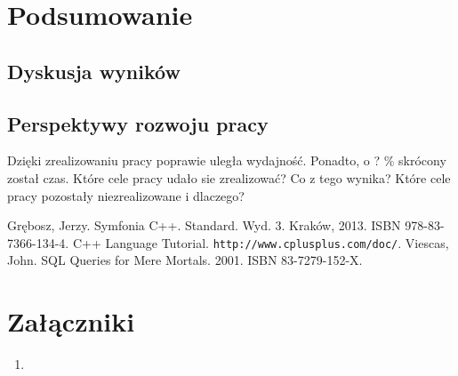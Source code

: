 \documentclass[12pt]{report}
\begin{document}
\chapter{Podsumowanie} \label{podsumowanie}

\section{Dyskusja wyników}

\section{Perspektywy rozwoju pracy} %

Dzięki zrealizowaniu pracy poprawie uległa wydajność. Ponadto, o ? \% skrócony został czas. Które cele pracy udało sie zrealizować? Co z tego wynika? Które cele pracy 
pozostały niezrealizowane i dlaczego? 

\begin{thebibliography}{99}
 Grębosz, Jerzy. Symfonia C++. Standard. Wyd. 3. Kraków, 2013. ISBN 978-83-7366-134-4.
 C++ Language Tutorial. {\tt http://www.cplusplus.com/doc/}.
 Viescas, John. SQL Queries for Mere Mortals. 2001. ISBN 83-7279-152-X.
\end{thebibliography}

\listoffigures

\listoftables

\chapter*{Załączniki}
\begin{enumerate}
\item
\end{enumerate}
\end{document}
